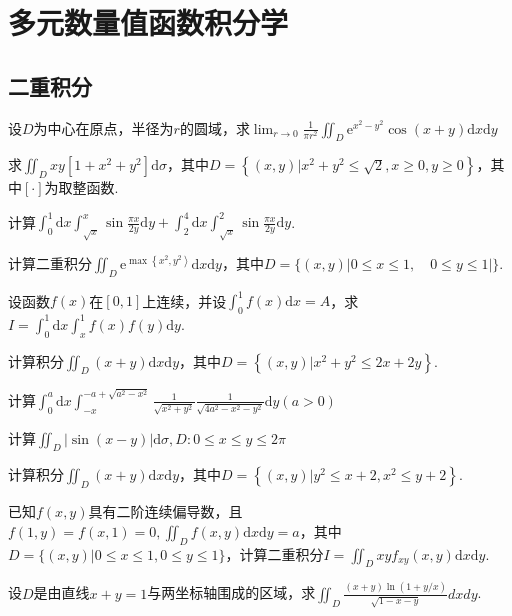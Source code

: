 \chapter{多元数量值函数积分学}\label{cha:5}
\section{二重积分}
\begin{xiti}
	\item 设$D$为中心在原点，半径为$r$的圆域，求$\lim _{r \rightarrow 0} \frac{1}{\pi r^{2}} \iint_{D} \mathrm{e}^{x^{2}-y^{2}} \cos (x+y) \mathrm{d} x \mathrm{d} y$
	\item 求$\iint_{D} x y\left[1+x^{2}+y^{2}\right] \mathrm{d} \sigma$，其中$D=\left\{(x, y) | x^{2}+y^{2} \leqslant \sqrt{2}, x \geqslant 0, y \geqslant 0\right\}$，其中$[\cdot]$为取整函数.
	\item 计算$\int_{0}^{1} \mathrm{d} x \int_{\sqrt{x}}^{x} \sin \frac{\pi x}{2 y} \mathrm{d} y+\int_{2}^{4} \mathrm{d} x \int_{\sqrt{x}}^{2} \sin \frac{\pi x}{2 y} \mathrm{d} y$.
	\item 计算二重积分$\iint_{D} \mathrm{e}^{\max \left\{x^{2}, y^{2}\right\rangle} \mathrm{d} x \mathrm{d} y$，其中$D=\{(x, y)|0 \leqslant x \leqslant 1, \quad 0 \leqslant y \leqslant 1|\}$.
	\item 设函数$f(x)$在$[0,1]$上连续，并设$\int_{0}^{1} f(x) \mathrm{d} x=A$，求$I=\int_{0}^{1} \mathrm{d} x \int_{x}^{1} f(x) f(y) \mathrm{d} y$.
	\item 计算积分$\iint_{D}(x+y) \mathrm{d} x \mathrm{d}y$，其中$D=\left\{(x, y) | x^{2}+y^{2} \leqslant 2 x+2 y\right\}$.
	
	\item 计算$\int_{0}^{a} \mathrm{d} x \int_{-x}^{-a+\sqrt{a^{2}-x^{2}}} \frac{1}{\sqrt{x^{2}+y^{2}}} \frac{1}{\sqrt{4 a^{2}-x^{2}-y^{2}}} \mathrm{d} y (a>0)$
	\item 计算$\iint_{D} |\sin (x-y) | \mathrm{d} \sigma, D : 0 \leqslant x \leqslant y \leqslant 2 \pi$
	\item 计算积分$\iint_{D}(x+y) \mathrm{d} x \mathrm{d}y$，其中$D=\left\{(x, y) | y^{2} \leqslant x+2, x^{2} \leqslant y+2\right\}$.
	\item 已知$f(x,y)$具有二阶连续偏导数，且$f(1, y)=f(x, 1)=0,  \iint_{D} f(x, y) \mathrm{d} x \mathrm{d} y=a$，其中$D=\{(x, y) | 0 \leqslant x \leqslant 1,0 \leqslant y \leqslant 1\}$，计算二重积分$I=\iint_{D} x y f_{x y}(x, y) \mathrm{d} x \mathrm{d} y$.
	\item 设$D$是由直线$x+y=1$与两坐标轴围成的区域，求$\iint_{D} \frac{(x+y) \ln (1+y / x)}{\sqrt{1-x-y}} d x d y$.	
	

\end{xiti}
